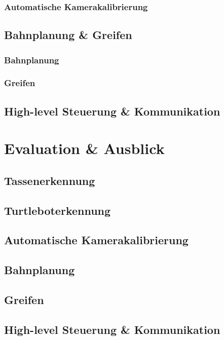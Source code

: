 \documentclass[de,ids]{fziartcl}
\begin{document}
\subsubsection{Automatische Kamerakalibrierung}

\subsection{Bahnplanung \& Greifen}
\subsubsection{Bahnplanung}

\subsubsection{Greifen}

\subsection{High-level Steuerung \& Kommunikation}


\section{Evaluation \& Ausblick}
\subsection{Tassenerkennung}

\subsection{Turtleboterkennung}

\subsection{Automatische Kamerakalibrierung}

\subsection{Bahnplanung}

\subsection{Greifen}

\subsection{High-level Steuerung \& Kommunikation}




\end{document}
